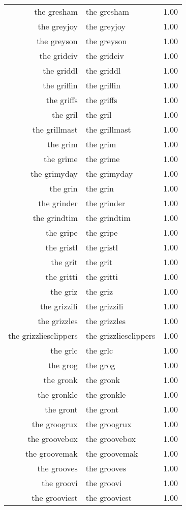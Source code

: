 \begin{table}[ht]
\begin{tabular}{rlr}
  the gresham & the gresham & 1.00 \\ 
  the greyjoy & the greyjoy & 1.00 \\ 
  the greyson & the greyson & 1.00 \\ 
  the gridciv & the gridciv & 1.00 \\ 
  the griddl & the griddl & 1.00 \\ 
  the griffin & the griffin & 1.00 \\ 
  the griffs & the griffs & 1.00 \\ 
  the gril & the gril & 1.00 \\ 
  the grillmast & the grillmast & 1.00 \\ 
  the grim & the grim & 1.00 \\ 
  the grime & the grime & 1.00 \\ 
  the grimyday & the grimyday & 1.00 \\ 
  the grin & the grin & 1.00 \\ 
  the grinder & the grinder & 1.00 \\ 
  the grindtim & the grindtim & 1.00 \\ 
  the gripe & the gripe & 1.00 \\ 
  the gristl & the gristl & 1.00 \\ 
  the grit & the grit & 1.00 \\ 
  the gritti & the gritti & 1.00 \\ 
  the griz & the griz & 1.00 \\ 
  the grizzili & the grizzili & 1.00 \\ 
  the grizzles & the grizzles & 1.00 \\ 
  the grizzliesclippers & the grizzliesclippers & 1.00 \\ 
  the grlc & the grlc & 1.00 \\ 
  the grog & the grog & 1.00 \\ 
  the gronk & the gronk & 1.00 \\ 
  the gronkle & the gronkle & 1.00 \\ 
  the gront & the gront & 1.00 \\ 
  the groogrux & the groogrux & 1.00 \\ 
  the groovebox & the groovebox & 1.00 \\ 
  the groovemak & the groovemak & 1.00 \\ 
  the grooves & the grooves & 1.00 \\ 
  the groovi & the groovi & 1.00 \\ 
  the grooviest & the grooviest & 1.00 \\ 

\end{tabular}
\end{table}

